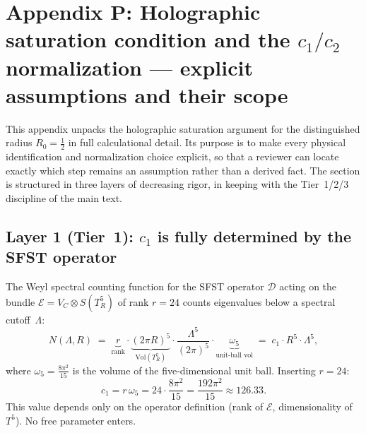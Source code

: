
\section{Appendix P: Holographic saturation condition and the
  $c_1/c_2$ normalization --- explicit assumptions and their scope}
\label{app:holographic}

This appendix unpacks the holographic saturation argument for the
distinguished radius $R_0=\tfrac{1}{2}$ in full calculational detail.
Its purpose is to make every physical identification and normalization
choice explicit, so that a reviewer can locate exactly which step
remains an assumption rather than a derived fact.  The section is
structured in three layers of decreasing rigor, in keeping with the
Tier~1/2/3 discipline of the main text.

\subsection{Layer 1 (Tier~1): $c_1$ is fully determined by the
  SFST operator}
\label{ssec:c1}

The Weyl spectral counting function for the SFST operator
$\mathcal{D}$ acting on the bundle
$\mathcal{E}=V_C\otimes S(T^5_R)$ of rank $r=24$ counts eigenvalues
below a spectral cutoff~$\Lambda$:
\begin{equation}
  \label{eq:Weyl}
  N(\Lambda,R) \;=\;
  \underbrace{r}_{\text{rank}} \cdot
  \underbrace{(2\pi R)^5}_{\mathrm{Vol}(T^5_R)} \cdot
  \frac{\Lambda^5}{(2\pi)^5} \cdot
  \underbrace{\omega_5}_{\text{unit-ball vol}}
  \;=\;
  c_1 \cdot R^5 \cdot \Lambda^5,
\end{equation}
where $\omega_5 = \tfrac{8\pi^2}{15}$ is the volume of the
five-dimensional unit ball.  Inserting $r=24$:
\begin{equation}
  \label{eq:c1value}
  \boxed{c_1 = r\,\omega_5 = 24\cdot\frac{8\pi^2}{15}
              = \frac{192\pi^2}{15}
              \approx 126.33.}
\end{equation}
This value depends only on the operator definition (rank of
$\mathcal{E}$, dimensionality of $T^5$).  No free parameter enters.


